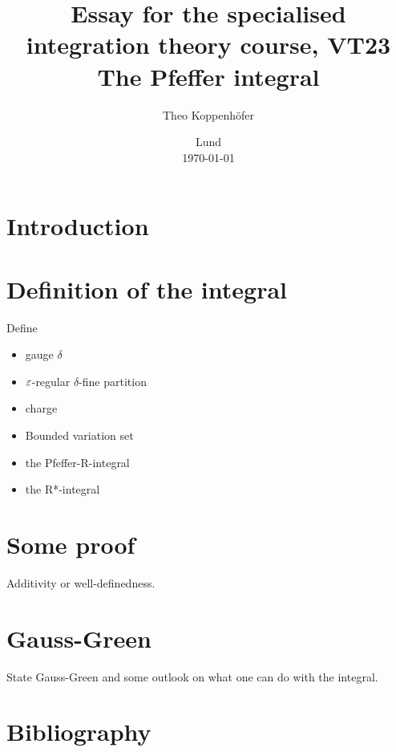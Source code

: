 




\title{ Essay for the specialised integration theory course, VT23 \\[1ex]
	  \large The Pfeffer integral}
\author{Theo Koppenhöfer}
\date{Lund \\[1ex] \today}







\maketitle

\section{Introduction}

\section{Definition of the integral}

Define
\begin{itemize}
	\item gauge $\delta$
	\item $\varepsilon$-regular $\delta$-fine partition
	\item charge
	\item Bounded variation set
	\item the Pfeffer-R-integral
	\item the R*-integral
\end{itemize}

\section{Some proof}

Additivity or well-definedness.


\section{Gauss-Green}

State Gauss-Green and some outlook on what one can do with the integral.


\section*{Bibliography}
\nocite{*}
\printbibliography


